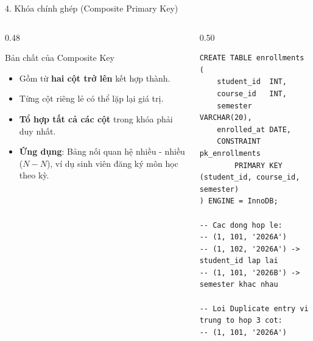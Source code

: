 \documentclass[aspectratio=169,11pt]{beamer}
\newcommand{\kw}[1]{\textcolor{dbblue}{\textbf{#1}}}
\begin{document}
\begin{frame}[fragile]{4. Khóa chính ghép (Composite Primary Key)}
\begin{columns}[t]
  \begin{column}{0.48\textwidth}
    \begin{block}{Bản chất của Composite Key}
      \begin{itemize}\setlength{\itemsep}{1.5pt}
        \item Gồm từ \kw{hai cột trở lên} kết hợp thành.
        \item Từng cột riêng lẻ có thể lặp lại giá trị.
        \item \kw{Tổ hợp tất cả các cột} trong khóa phải duy nhất.
        \item \textbf{Ứng dụng}: Bảng nối quan hệ nhiều - nhiều ($N-N$), ví dụ sinh viên đăng ký môn học theo kỳ.
      \end{itemize}
    \end{block}
  \end{column}
  \begin{column}{0.50\textwidth}
\begin{lstlisting}
CREATE TABLE enrollments (
    student_id  INT,
    course_id   INT,
    semester    VARCHAR(20),
    enrolled_at DATE,
    CONSTRAINT pk_enrollments 
        PRIMARY KEY (student_id, course_id, semester)
) ENGINE = InnoDB;

-- Cac dong hop le:
-- (1, 101, '2026A')
-- (1, 102, '2026A') -> student_id lap lai
-- (1, 101, '2026B') -> semester khac nhau

-- Loi Duplicate entry vi trung to hop 3 cot:
-- (1, 101, '2026A')
\end{lstlisting}
  \end{column}
\end{columns}
\end{frame}

\end{document}
